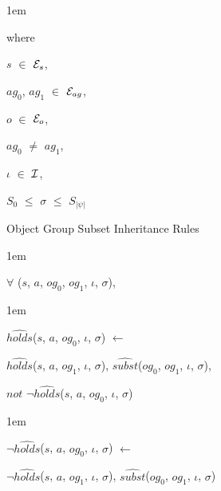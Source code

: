 \documentclass[11pt]{report}
\newenvironment{vquote}
{
  \begin{list}{}{\leftmargin 1em}\item[]
}
{
  \end{list}
}
\begin{document}
\begin{enumerate}
                  \begin{vquote}
                    where

                    \hspace{1em}
                    $s$ $\in$ ${\cal E}_{s}$,

                    \hspace{1em}
                    $ag_0$, $ag_1$ $\in$ ${\cal E}_{ag}$,

                    \hspace{1em}
                    $o$ $\in$ ${\cal E}_{o}$,

                    \hspace{1em}
                    $ag_0$ $\neq$ $ag_1$,

                    \hspace{1em}
                    $\iota$ $\in$ ${\cal I}$,

                    \hspace{1em}
                    $S_{0}$ $\leq$ $\sigma$ $\leq$ $S_{|\psi|}$
                  \end{vquote}

                \item
                  Object Group Subset Inheritance Rules

                  \begin{vquote}
                    $\forall$ ($s$, $a$, $og_0$, $og_1$, $\iota$, $\sigma$),
                  \end{vquote}

                  \begin{vquote}
                    $\hat{holds}$($s$, $a$, $og_0$, $\iota$, $\sigma$)
                    $\leftarrow$

                    \hspace{1em}
                    $\hat{holds}$($s$, $a$, $og_1$, $\iota$, $\sigma$),
                    $\hat{subst}$($og_0$, $og_1$, $\iota$, $\sigma$),

                    \hspace{1em}
                    $not$ $\lnot\hat{holds}$($s$, $a$, $og_0$, $\iota$, $\sigma$)
                  \end{vquote}

                  \begin{vquote}
                    $\lnot\hat{holds}$($s$, $a$, $og_0$, $\iota$, $\sigma$)
                    $\leftarrow$

                    \hspace{1em}
                    $\lnot\hat{holds}$($s$, $a$, $og_1$, $\iota$, $\sigma$),
                    $\hat{subst}$($og_0$, $og_1$, $\iota$, $\sigma$)
                  \end{vquote}


\end{enumerate}
\end{document}
